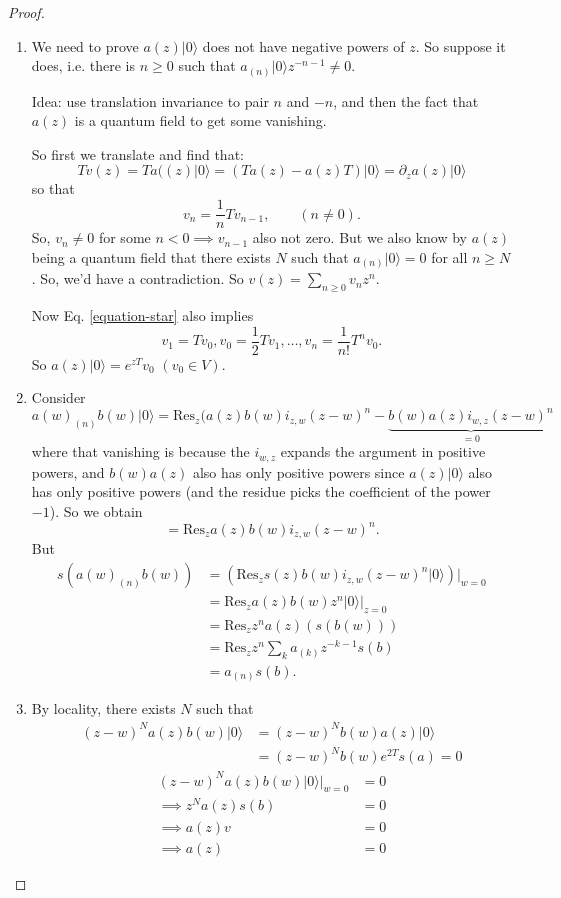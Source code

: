 \begin{proof}
\begin{enumerate}
\item We need to prove $a(z)|0\rangle$ does
not have negative
powers of $z$. So suppose it does, i.e. there
is $n\geq 0$ such that
$a_{(n)}|0\rangle z^{-n-1}\neq 0$.

Idea: use translation invariance to pair $n$
and $-n$, and
then the fact that $a(z)$ is a quantum field
to get some vanishing.

So first we translate and find that:
$$
Tv(z)=Ta((z)|0\rangle=(Ta(z)-a(z)T)|0\rangle=
\partial_z
a(z)|0\rangle
$$
so that
\begin{equation}
\label{equation-star}
v_n=\frac{1}{n}Tv_{n-1},\qquad (n \neq 0).
\end{equation}
So, $v_n \neq 0$ for some $n<0 \implies
v_{n-1}$ also not zero.
But we also know by $a(z)$ being a quantum
field
that there exists $N$ such that
$a_{(n)}|0\rangle=0$ for all $n \geq N$.
So, we'd have a contradiction.
So $v(z)=\sum_{n \geq 0}v_nz^n$.

Now Eq. \ref{equation-star} also implies
$$
v_1=Tv_0,v_0=\frac{1}{2}Tv_1,\ldots,
v_n=\frac{1}{n!}T^nv_0.
$$
So $a(z)|0\rangle=e^{zT}v_0$ $(v_0 \in V)$.

\item Consider
$$
a(w)_{(n)}b(w)|0\rangle=
\text{Res}_z(a(z)b(w)i_{z,w}(z-w)^n-
\underbrace{b(w)a(z)i_{w,z}(z-w)^n}_{=0}
$$
where that vanishing is because the $i_{w,z}$
expands the argument
in positive powers, and $b(w)a(z)$ also has
only positive powers
since $a(z)|0\rangle$ also has only positive
powers
(and the residue picks the coefficient of the
power  $-1$).
So we obtain
$$
=\text{Res}_za(z)b(w)i_{z,w}(z-w)^n.
$$
But
$$
\begin{aligned}
s(a(w)_{(n)}b(w))&=\left(
\text{Res}_zs(z)b(w)i_{z,w}(z-w)
^n|0\rangle\right)|_{w=0}\\
&=\text{Res}_za(z)b(w)z^n|0\rangle|_{z=0}\\
&=\text{Res}_z z^n a(z)(s(b(w)))\\
&=\text{Res}_z z^n
\sum_{k}a_{(k)}z^{-k-1}s(b)\\
&=a_{(n)}s(b).
\end{aligned}
$$

\item By locality, there exists $N$ such that
$$
\begin{aligned}
(z-w)^Na(z)b(w)
|0\rangle&=(z-w)^Nb(w)a(z)|0\rangle\\
&=(z-w)^Nb(w)e^{2T}s(a)=0
\end{aligned}
$$
$$
\begin{aligned}
(z-w)^Na(z)b(w)|0\rangle |_{w=0}&=0\\
\implies z^Na(z)s(b)&=0\\
\implies a(z)v&=0\\
\implies a(z)&=0
\end{aligned}
$$
\end{enumerate}
\end{proof}

